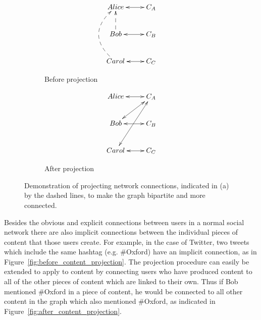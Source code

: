 \begin{figure}
  \centering
  \begin{subfigure}[b]{0.4\textwidth}
    \centering
    \begin{displaymath}
    \xymatrix{
    Alice \ar@{<->}[r]  & C_{A} \\
    Bob \ar@{<->}[r] \ar@{-->}[u]    & C_{B} \\
    Carol  \ar@{<->}[r] \ar@{-->}@/^2pc/[uu] & C_{C} }
    \end{displaymath}
    \caption{Before projection}
    \label{fig:before_network_projection}

  \end{subfigure}
  \quad
  \begin{subfigure}[b]{0.4\textwidth}
    \centering
    \begin{displaymath}
    \xymatrix{
    Alice \ar@{<->}[r]  & C_{A} \\
    Bob \ar@{<->}[r] \ar@{<->}[ur]    & C_{B} \\
    Carol  \ar@{<->}[r] \ar@{<->}[uur] & C_{C} }
    \end{displaymath}
    \caption{After projection}
    \label{fig:after_network_projection} 
  \end{subfigure}
  \caption[Projecting network connections into the bipartite graph]{ Demonstration of projecting network connections, indicated in (a) by the dashed lines, to make the graph bipartite and more connected. }
  \label{fig:network_projection}
\end{figure}

Besides the obvious and explicit connections between users in a normal social network there are also implicit connections between the individual pieces of content that those users create. For example, in the case of Twitter, two tweets which include the same hashtag (e.g. \#Oxford) have an implicit connection, as in Figure~\ref{fig:before_content_projection}. The projection procedure can easily be extended to apply to content by connecting users who have produced content to all of the other pieces of content which are linked to their own. Thus if Bob mentioned \#Oxford in a piece of content, he would be connected to all other content in the graph which also mentioned \#Oxford, as indicated in Figure~\ref{fig:after_content_projection}.

